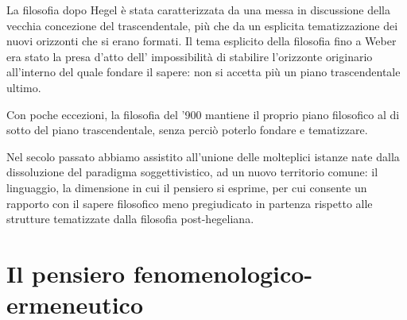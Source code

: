 La filosofia dopo Hegel è stata caratterizzata
da una messa in discussione della vecchia concezio­ne del trascendentale, più che da un esplicita
tematizzazione dei nuovi orizzonti che si erano
formati. Il tema esplicito della filosofia
fino a Weber era stato la presa d'atto dell'
impossibilità di stabilire l'orizzonte originario
all'interno del quale fondare il sapere: non si
accetta più un piano trascendentale ultimo.

Con poche eccezioni, la filosofia del '900
mantiene il proprio piano filosofico al di sotto
del piano trascendentale, senza perciò poterlo
fondare e tematizzare.

Nel secolo passato abbiamo assistito all'unione
delle molteplici istanze nate dalla dissoluzione
del paradigma soggettivistico, ad un nuovo
territorio comune: il linguaggio, la dimensione
in cui il pensiero si esprime, per cui consente
un rapporto con il sapere filosofico meno pregiudicato in partenza rispetto alle strutture tematizzate dalla filosofia post-hegeliana.

\chapter{Il pensiero fenomenologico-ermeneutico}